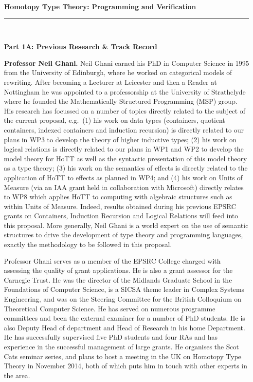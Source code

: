 \documentclass[a4paper,11pt]{article}
\newcommand{\eg}{{e.g.}\ }
\begin{document}
\thispagestyle{plain}
\begin{center}
  {\Large {\bf Homotopy Type Theory: Programming and Verification}}\\[1ex] 

\vspace*{-0.1in}

  \rule{140mm}{.5mm}\\[2ex]
\end{center}

\noindent
{\bf \Large Part 1A: Previous Research \& Track Record}

\textbf{Professor Neil Ghani.} Neil Ghani earned his PhD in Computer
Science in 1995 from the University of Edinburgh, where he worked on
categorical models of rewriting.  After becoming a Lecturer at
Leicester and then a Reader at Nottingham he was appointed to a
professorship at the University of Strathclyde where he founded the
Mathematically Structured Programming (MSP) group. His research has
focussed on a number of topics directly related to the subject of the
current proposal, \eg (1) his work on data types (containers, quotient
containers, indexed containers and induction recursion) is directly
related to our plans in WP3 to develop the theory of higher inductive
types; (2) his work on logical relations is directly related to our
plans in WP1 and WP2 to develop the model theory for HoTT as well as
the syntactic presentation of this model theory as a type theory; (3)
his work on the semantics of effects is directly related to the
application of HoTT to effects as planned in WP4; and (4) his work on
Units of Measure (via an IAA grant held in collaboration with
Microsoft) directly relates to WP8 which applies HoTT to computing
with algebraic structures such as within Units of Measure. Indeed,
results obtained during his previous EPSRC grants on Containers,
Induction Recursion and Logical Relations will feed into this
proposal.  More generally, Neil Ghani is a world expert on the use of
semantic structures to drive the development of type theory and
programming languages, exactly the methodology to be followed in this
proposal.

Professor Ghani serves as a member of the EPSRC College charged with
assessing the quality of grant applications. He is also a grant
assessor for the Carnegie Trust.  He was the director of the Midlands
Graduate School in the Foundations of Computer Science, is a SICSA
theme leader in Complex Systems Engineering, and was on the Steering
Committee for the British Colloquium on Theoretical Computer Science.
He has served on numerous programme committees and been the external
examiner for a number of PhD students. He is also Deputy Head of
department and Head of Research in his home Department. He has
successfully supervised five PhD students and four RAs and has
experience in the successful management of large grants. He organises
the Scot Cats seminar series, and plans to host a meeting in the UK on
Homotopy Type Theory in November 2014, both of which puts him in touch
with other experts in the area.
\end{document}

